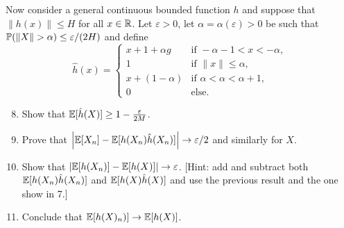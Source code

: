 \begin{problem}
Now consider a general continuous bounded function $h$ and suppose that $\|h(x)\| \le H$ for all $x \in \mathbb R$. Let $\varepsilon > 0$, let $\alpha = \alpha(\varepsilon) > 0$ be such that $\mathbb P(\|X\| > \alpha) \le \varepsilon/(2H)$ and define
\[
	\hat{h}(x) = \begin{cases}
		x + 1 + \alpha g&\text{if } -\alpha - 1 < x < -\alpha,\\
		1 &\text{if } \|x\| \le \alpha,\\
		x + (1-\alpha) &\text{if } \alpha < \alpha < \alpha +1,\\
		0 &\text{else.}
	\end{cases}
\]
\begin{enumerate}
\setcounter{enumi}{7}
\item Show that $\mathbb E[\hat{h}(X)] \ge 1 - \frac{\varepsilon}{2M}$.
\item Prove that $\left|\mathbb E[X_n] - \mathbb E[h(X_n)\hat{h}(X_n)] \right| \to \varepsilon/2$ and similarly for $X$.
\item Show that $\left|\mathbb E[h(X_n)] - \mathbb E[h(X)]\right| \to \varepsilon$. [Hint: add and subtract both $\mathbb E[h(X_n)\hat{h}(X_n)]$ and $\mathbb E[h(X)\hat{h}(X)]$ and use the previous result and the one show in 7.]
\item Conclude that $\mathbb E[h(X)_n)] \to \mathbb E[h(X)]$.
\end{enumerate} 

\end{problem}

